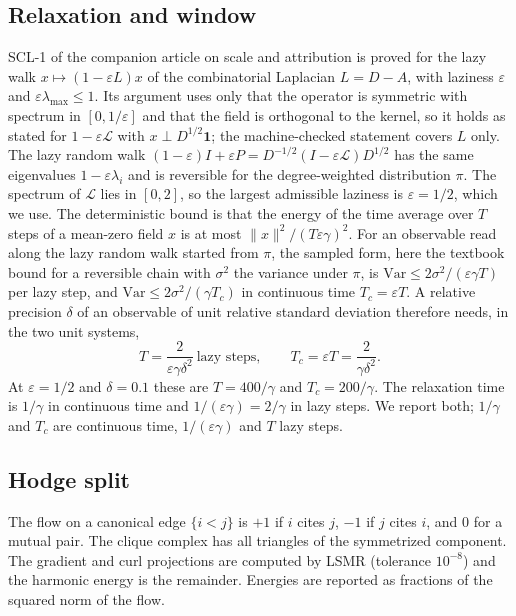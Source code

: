 \documentclass[11pt]{article}
\begin{document}
\subsection{Relaxation and window}\label{sec:window}
SCL-1 of the companion article on scale and attribution is proved for the lazy walk
$x \mapsto (1 - \varepsilon L)x$ of the combinatorial Laplacian $L = D - A$, with laziness $\varepsilon$
and $\varepsilon\lambda_{\max} \le 1$. Its argument uses only that the operator is symmetric with
spectrum in $[0, 1/\varepsilon]$ and that the field is orthogonal to the kernel, so it holds as stated
for $1 - \varepsilon\mathcal L$ with $x \perp D^{1/2}\mathbf 1$; the machine-checked statement covers $L$
only. The lazy random walk $(1-\varepsilon)I + \varepsilon P = D^{-1/2}(I - \varepsilon\mathcal L)D^{1/2}$
has the same eigenvalues $1 - \varepsilon\lambda_i$ and is reversible for the degree-weighted
distribution $\pi$. The spectrum of $\mathcal L$ lies in $[0,2]$, so the largest admissible laziness
is $\varepsilon = 1/2$, which we use. The deterministic bound is that the energy of
the time average over $T$ steps of a mean-zero field $x$ is at most $\|x\|^2/(T\varepsilon\gamma)^2$. For an
observable read along the lazy random walk started from $\pi$, the sampled form, here the textbook
bound for a reversible chain \citep{levin2017} with $\sigma^2$ the variance under $\pi$, is
$\mathrm{Var} \le 2\sigma^2/(\varepsilon\gamma T)$ per lazy step, and
$\mathrm{Var} \le 2\sigma^2/(\gamma T_c)$ in continuous time $T_c = \varepsilon T$. A relative precision
$\delta$ of an observable of unit relative standard deviation therefore needs, in the two unit systems,
\[
T = \frac{2}{\varepsilon\gamma\delta^2}\ \text{lazy steps}, \qquad T_c = \varepsilon T = \frac{2}{\gamma\delta^2}.
\]
At $\varepsilon = 1/2$ and $\delta = 0.1$ these are $T = 400/\gamma$ and $T_c = 200/\gamma$. The relaxation time
is $1/\gamma$ in continuous time and $1/(\varepsilon\gamma) = 2/\gamma$ in lazy steps. We report both;
$1/\gamma$ and $T_c$ are continuous time, $1/(\varepsilon\gamma)$ and $T$ lazy steps.

\subsection{Hodge split}
The flow on a canonical edge $\{i<j\}$ is $+1$ if $i$ cites $j$, $-1$ if $j$ cites $i$, and $0$ for a
mutual pair. The clique complex has all triangles of the symmetrized component. The gradient and
curl projections are computed by LSMR (tolerance $10^{-8}$) and the harmonic energy is the
remainder. Energies are reported as fractions of the squared norm of the flow.
\end{document}

